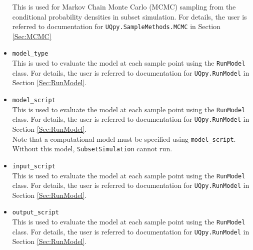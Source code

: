 \begin{itemize}
	This is used for Markov Chain Monte Carlo (MCMC) sampling from the conditional probability densities in subset simulation. For details, the user is referred to documentation for 		\texttt{UQpy.SampleMethods.MCMC} in Section \ref{Sec:MCMC}
\item \texttt{model\_type}\\
	This is used to evaluate the model at each sample point using the \texttt{RunModel} class. For details, the user is referred to documentation for \texttt{UQpy.RunModel} in Section \ref{Sec:RunModel}.
\item \texttt{model\_script}\\
	This is used to evaluate the model at each sample point using the \texttt{RunModel} class. For details, the user is referred to documentation for \texttt{UQpy.RunModel} in Section \ref{Sec:RunModel}.\\
    
    Note that a computational model must be specified using \texttt{model\_script}. Without this model, \texttt{SubsetSimulation} cannot run.
\item \texttt{input\_script}\\
	This is used to evaluate the model at each sample point using the \texttt{RunModel} class. For details, the user is referred to documentation for \texttt{UQpy.RunModel} in Section \ref{Sec:RunModel}.
\item \texttt{output\_script}\\
	This is used to evaluate the model at each sample point using the \texttt{RunModel} class. For details, the user is referred to documentation for \texttt{UQpy.RunModel} in Section \ref{Sec:RunModel}.
\end{itemize}

